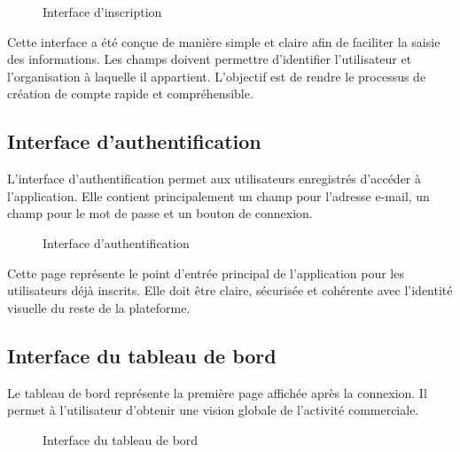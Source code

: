\documentclass[12pt,a4paper]{report}
\begin{document}
\begin{figure}[h]
    \centering
    \caption{Interface d’inscription}
    \label{fig:interface_inscription}
\end{figure}

Cette interface a été conçue de manière simple et claire afin de faciliter la saisie des informations. Les champs doivent permettre d’identifier l’utilisateur et l’organisation à laquelle il appartient. L’objectif est de rendre le processus de création de compte rapide et compréhensible.

\subsection{Interface d’authentification}

L’interface d’authentification permet aux utilisateurs enregistrés d’accéder à l’application. Elle contient principalement un champ pour l’adresse e-mail, un champ pour le mot de passe et un bouton de connexion.

\begin{figure}[h]
    \centering
    \caption{Interface d’authentification}
    \label{fig:interface_login}
\end{figure}

Cette page représente le point d’entrée principal de l’application pour les utilisateurs déjà inscrits. Elle doit être claire, sécurisée et cohérente avec l’identité visuelle du reste de la plateforme.

\subsection{Interface du tableau de bord}

Le tableau de bord représente la première page affichée après la connexion. Il permet à l’utilisateur d’obtenir une vision globale de l’activité commerciale.

\begin{figure}[h]
    \centering
    \caption{Interface du tableau de bord}
    \label{fig:interface_dashboard}
\end{figure}
\end{document}
